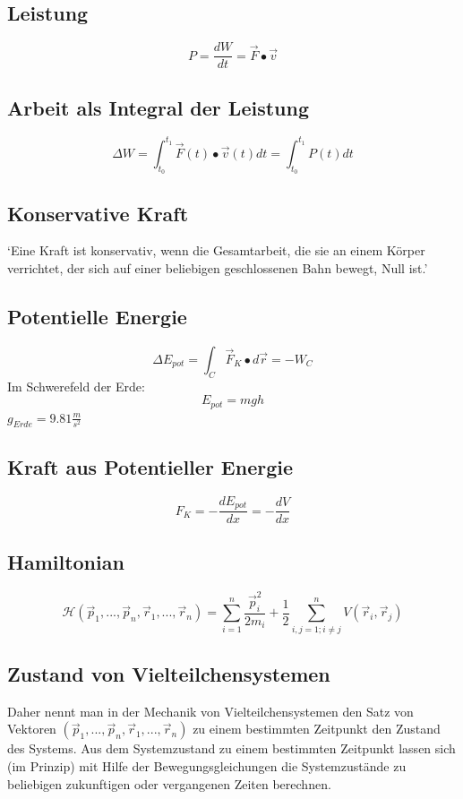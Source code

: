 \documentclass{article}
\begin{document}
\begin{multicols*}{3}
  \subsection{Leistung}
  $$P = \frac{dW}{dt} = \vec{F} \bullet \vec{v}$$

  \subsection{Arbeit als Integral der Leistung}
  $$\Delta W = \int_{t_0}^{t_1} \vec{F}(t) \bullet \vec{v}(t) dt = \int_{t_0}^{t_1} P(t) dt$$

  \subsection{Konservative Kraft}
  ‘Eine Kraft ist konservativ, wenn die Gesamtarbeit, die sie an einem Körper
  verrichtet, der sich auf einer beliebigen geschlossenen Bahn bewegt, Null
  ist.’
  \subsection{Potentielle Energie}

  $$\Delta E_{pot} = \int_{C} \vec{F}_K \bullet d\vec{r} = -W_C$$
  Im Schwerefeld der Erde:
  $$E_{pot}=mgh$$
  $g_{Erde} = 9.81 \frac{m}{s^2}$

  \subsection{Kraft aus Potentieller Energie}
  $$F_K = - \frac{dE_{pot}}{dx} = - \frac{dV}{dx}$$

  \subsection{Hamiltonian}

  $$\mathcal{H}(\vec{p}_1,...,\vec{p}_n, \vec{r}_1,...,\vec{r}_n) = \sum_{i=1}^{n} \frac{\vec{p}_i^2}{2m_i} + \frac{1}{2} \sum_{i,j =1; i \neq j}^{n} V(\vec{r}_i, \vec{r}_j)$$

  \subsection{Zustand von Vielteilchensystemen}

  Daher nennt man in der Mechanik von Vielteilchensystemen den Satz von Vektoren
  $(\vec{p}_1,...,\vec{p}_n, \vec{r}_1,...,\vec{r}_n)$
  zu einem bestimmten Zeitpunkt den Zustand des Systems. Aus dem Systemzustand zu
  einem bestimmten Zeitpunkt lassen sich (im Prinzip) mit Hilfe der Bewegungsgleichungen
  die Systemzustände zu beliebigen zukunftigen oder vergangenen Zeiten berechnen.


\end{multicols*}
\end{document}
